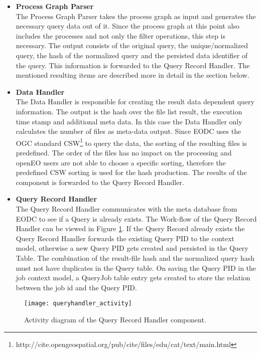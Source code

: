 \documentclass[draft,final]{vutinfth} %
\begin{document}
 \begin{itemize}
	\item \textbf{Process Graph Parser} \\
	The Process Graph Parser takes the process graph as input and generates the necessary query data out of it. Since the process graph at this point also includes the processes and not only the filter operations, this step is necessary. The output consists of the original query, the unique/normalized query, the hash of the normalized query and the persisted data identifier of the query. This information is forwarded to the Query Record Handler. The mentioned resulting items are described more in detail in the section below.  
	\item \textbf{Data Handler} \\ 
	The Data Handler is responsible for creating the result data dependent query information. The output is the hash over the file list result, the execution time stamp and additional meta data. In this case the Data Handler only calculates the number of files as meta-data output. Since EODC uses the OGC standard CSW\footnote{http://cite.opengeospatial.org/pub/cite/files/edu/cat/text/main.html} to query the data, the sorting of the resulting files is predefined. The order of the files has no impact on the processing and openEO users are not able to choose a specific sorting, therefore the predefined CSW sorting is used for the hash production. The results of the component is forwarded to the Query Record Handler.    
	\item \textbf{Query Record Handler} \\
	The Query Record Handler communicates with the meta database from EODC to see if a Query is already exists. The Work-flow of the Query Record Handler can be viewed in Figure \ref{fig:queryhandler_activity}. If the Query Record already exists the Query Record Handler forwards the existing Query PID to the context model, otherwise a new Query PID gets created and persisted in the Query Table. The combination of the result-file hash and the normalized query hash must not have duplicates in the Query table. On saving the Query PID in the job context model, a QueryJob table entry gets created to store the relation between the job id and the Query PID. 
	
\end{itemize}

\begin{figure}[h]
	\centering
	\texttt{[image: queryhandler\_activity]}
	\caption{Activity diagram of the Query Record Handler component.}
	\label{fig:queryhandler_activity} %
\end{figure}
\end{document}
